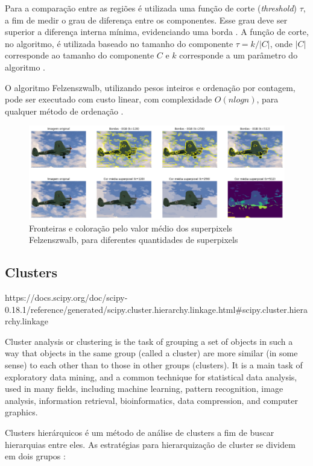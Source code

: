 \begin{document}
Para a comparação entre as regiões é utilizada uma função de corte (\textit{threshold}) $\tau$, a fim de medir o grau de diferença entre os componentes. Esse grau deve ser superior a diferença interna mínima, evidenciando uma borda \cite{FELZENSZWALB}. A função de corte, no algoritmo, é utilizada baseado no tamanho do componente $\tau=k/|C|$, onde $|C|$ corresponde ao tamanho do componente $C$ e $k$ corresponde a um parâmetro do algoritmo \cite{FELZENSZWALB}.

O algoritmo Felzenszwalb, utilizando pesos inteiros e ordenação por contagem, pode ser executado com custo linear, com complexidade $O(nlogn)$, para qualquer método de ordenação \cite{FELZENSZWALB}.

\begin{figure}[ht]
\centering
\includegraphics[width=1.\textwidth]{felz_segmentation_compare.png}
\caption{Fronteiras e coloração pelo valor médio dos superpixels Felzenszwalb, para diferentes quantidades de superpixels}
\label{alg:SLIC}
\end{figure}

\subsection{Clusters} \label{sssec:clusters}

https://docs.scipy.org/doc/scipy-0.18.1/reference/generated/scipy.cluster.hierarchy.linkage.html#scipy.cluster.hierarchy.linkage

Cluster analysis or clustering is the task of grouping a set of objects in such a way that objects in the same group (called a cluster) are more similar (in some sense) to each other than to those in other groups (clusters). It is a main task of exploratory data mining, and a common technique for statistical data analysis, used in many fields, including machine learning, pattern recognition, image analysis, information retrieval, bioinformatics, data compression, and computer graphics.

Clusters hierárquicos é um método de análise de clusters a fim de buscar hierarquias entre eles. As estratégias para hierarquização de cluster se dividem em dois grupos \cite{ROKACH}:
\end{document}
